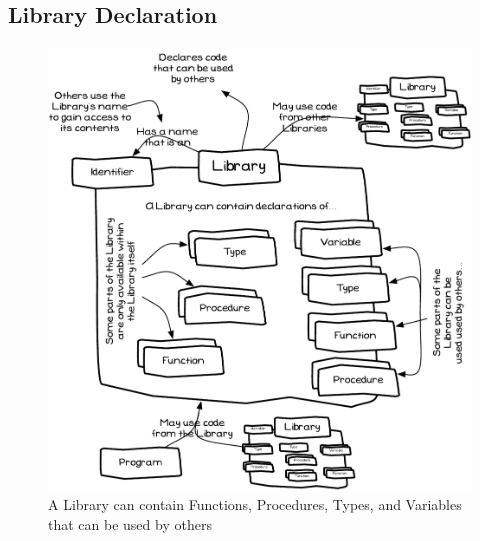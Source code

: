 \clearpage
\subsection{Library Declaration} %
\label{sub:library_declaration}

\begin{figure}[h]
\includegraphics[width=\textwidth]{topics/library-creation/diagrams/Library} 
 \caption{A Library can contain Functions, Procedures, Types, and Variables that can be used by others}
 \label{fig:library-creation-library}
\end{figure}

